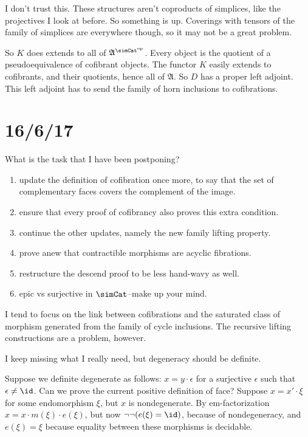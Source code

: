 \documentclass{tac}
\newcommand\dual{^{\mathrm{op}}}
\newcommand\s{^{\simCat\dual}}
\newcommand\ambient{\mathfrak A}
\begin{document}
I don't trust this. These structures aren't coproducts of simplices, like the projectives I look at before. So something is up.
Coverings with tensors of the family of simplices are everywhere though, so it may not be a great problem.

So $K$ does extends to all of $\ambient\s$. Every object is the quotient of a pseudoequivalence of cofibrant objects. The functor $K$ easily extends to cofibrants, and their quotients, hence all of $\ambient$. So $D$ has a proper left adjoint. This left adjoint has to send the family of horn inclusions to cofibrations.



\section{16/6/17}
What is the task that I have been postponing?
\begin{enumerate}
\item update the definition of cofibration once more, to say that the set of complementary faces covers the complement of the image.
\item ensure that every proof of cofibrancy also proves this extra condition.
\item continue the other updates, namely the new family lifting property.
\item prove anew that contractible morphisms are acyclic fibrations.
\item restructure the descend proof to be less hand-wavy as well.
\item epic vs surjective in $\simCat$--make up your mind.
\end{enumerate}

I tend to focus on the link between cofibrations and the saturated class of morphism generated from the family of cycle inclusions.
The recursive lifting constructions are a problem, however.

I keep missing what I really need, but degeneracy should be definite.

Suppose we definite degenerate as follows: $x=y\cdot\epsilon$ for a surjective $\epsilon$ such that $\epsilon\neq\id$.
Can we prove the current positive definition of face?
Suppose $x=x'\cdot\xi$ for some endomorphism $\xi$, but $x$ is nondegenerate. By em-factorization $x = x \cdot m(\xi)\cdot e(\xi)$, but now $\neg\neg(e(\xi)=\id)$, because of nondegeneracy, and $e(\xi) = \xi$ because equality between these morphisms is decidable.
\end{document}
